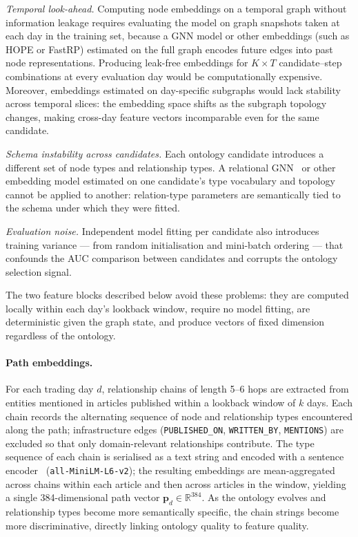 \textit{Temporal look-ahead.}
Computing node embeddings on a temporal graph without information leakage requires evaluating the
model on graph snapshots taken at each day in the training set, because a GNN model or other embeddings (such as HOPE or FastRP) estimated
on the full graph encodes future edges into past node representations.
Producing leak-free embeddings for $K \times T$ candidate--step combinations at every evaluation
day would be computationally expensive.
Moreover, embeddings estimated on day-specific subgraphs would lack stability across temporal slices:
the embedding space shifts as the subgraph topology changes, making cross-day feature vectors
incomparable even for the same candidate. 

\textit{Schema instability across candidates.}
Each ontology candidate introduces a different set of node types and relationship types.
A relational GNN~\citep{schlichtkrull2018rgcn} or other embedding model estimated on one candidate's type
vocabulary and topology cannot be applied to another: relation-type parameters are semantically tied to the
schema under which they were fitted.

\textit{Evaluation noise.}
Independent model fitting per candidate also introduces training variance --- from random
initialisation and mini-batch ordering --- that confounds the AUC comparison between candidates
and corrupts the ontology selection signal.

The two feature blocks described below avoid these problems: they are computed locally within each
day's lookback window, require no model fitting, are deterministic given the graph state, and
produce vectors of fixed dimension regardless of the ontology.

\paragraph{Path embeddings.}
For each trading day $d$, relationship chains of length 5--6 hops are extracted from entities
mentioned in articles published within a lookback window of $k$ days.
Each chain records the alternating sequence of node and relationship types encountered along the
path; infrastructure edges (\texttt{PUBLISHED\_ON}, \texttt{WRITTEN\_BY}, \texttt{MENTIONS}) are
excluded so that only domain-relevant relationships contribute.
The type sequence of each chain is serialised as a text string and encoded with a sentence
encoder~\citep{reimers2019sentencebert} (\texttt{all-MiniLM-L6-v2}); the resulting embeddings are
mean-aggregated across chains within each article and then across articles in the window, yielding a
single 384-dimensional path vector $\mathbf{p}_d \in \mathbb{R}^{384}$.
As the ontology evolves and relationship types become more semantically specific, the chain strings
become more discriminative, directly linking ontology quality to feature quality.

